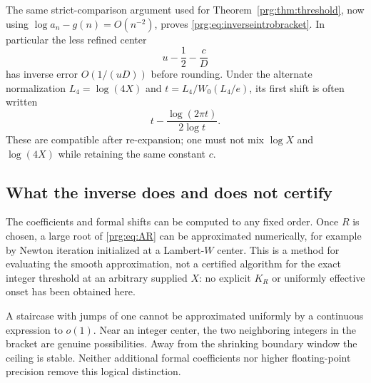 \documentclass[11pt,letterpaper]{article}
\numberwithin{equation}{section}
\theoremstyle{definition}\newtheorem{definition}[theorem]{Definition}
\theoremstyle{remark}\newtheorem{remark}[theorem]{Remark}
\begin{document}
The same strict-comparison argument used for
Theorem~\ref{prg:thm:threshold}, now using
$\log a_n-g(n)=O(n^{-2})$, proves
\eqref{prg:eq:inverseintrobracket}. In particular the less refined
center
\[
 u-\frac12-\frac{c}{D}
\]
has inverse error $O(1/(uD))$ before rounding. Under the alternate
normalization $L_4=\log(4X)$ and $t=L_4/W_0(L_4/e)$, its first
shift is often written
\[
 t-\frac{\log(2\pi t)}{2\log t}.
\]
These are compatible after re-expansion; one must not mix $\log X$
and $\log(4X)$ while retaining the same constant $c$.

\subsection{What the inverse does and does not certify}
The coefficients and formal shifts can be computed to any fixed
order. Once $R$ is chosen, a large root of \eqref{prg:eq:AR} can be
approximated numerically, for example by Newton iteration initialized
at a Lambert-$W$ center. This is a method for evaluating the smooth
approximation, not a certified algorithm for the exact integer
threshold at an arbitrary supplied $X$: no explicit $K_R$ or
uniformly effective onset has been obtained here.

A staircase with jumps of one cannot be approximated uniformly by a
continuous expression to $o(1)$. Near an integer center, the two
neighboring integers in the bracket are genuine possibilities.
Away from the shrinking boundary window the ceiling is stable.
Neither additional formal coefficients nor higher floating-point
precision remove this logical distinction.
\end{document}
